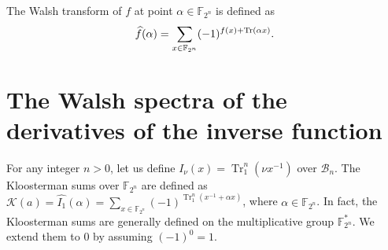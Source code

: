 \documentclass{article}
\newcommand{\F}{\mathbb{F}}
\newcommand{\0}{\textbf{0}}
\newcommand{\1}{\textbf{1}}
\newcommand{\B}{\mathcal{B}}
\newcommand{\TrN}{\operatorname{Tr}_1^n}
\theoremstyle{plain}
\newtheorem{lemma}{Lemma}
\theoremstyle{nonumberplain}
\begin{document}
    The Walsh transform of $ f $ at point $\alpha \in \F_{2^n}$ is defined as
    \begin{equation*}
        \widehat{f}(\alpha)=\sum_{x \in \F_{2^n}}(-1)^{f(x)+\Tr(\alpha x)}.
    \end{equation*}




\section{The Walsh spectra of the derivatives of the inverse function}

For any integer $n>0$, let us define $I_\nu(x)=\TrN(\nu x^{-1})$ over $\B_n$.
The Kloosterman sums over $\F_{2^n}$ are defined as
$\mathcal{K}(a)=\widehat{I_1}(\alpha)=\sum_{x\in\F_{2^n}}(-1)^{\TrN(x^{-1}+\alpha x)}$, where $\alpha\in\F_{2^n}$.
In fact, the Kloosterman sums are generally defined on the multiplicative
group $\F_{2^n}^*$. We extend them to $0$ by assuming $(-1)^0=1$.
\end{document}
